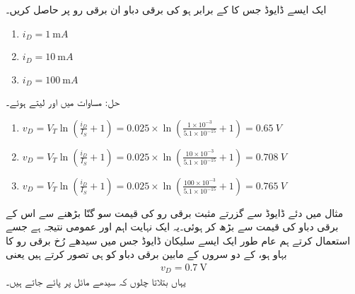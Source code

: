 ایک ایسے  ڈایوڈ جس کا   کے برابر ہو کی برقی دباو   ان برقی رو  پر حاصل کریں۔
\begin{enumerate}
\item
$i_D=\SI{1}{\milli A}$
\item
$i_D=\SI{10}{\milli A}$
\item
$i_D=\SI{100}{\milli A}$
\end{enumerate}
حل: مساوات   میں   اور  لیتے ہوئے۔
\begin{enumerate}
\item
$v_D=V_T \ln \left (\frac{i_D}{I_S}+1 \right ) =0.025 \times \ln \left (\frac{1 \times 10^{-3}}{5.1 \times 10^{-15}}+1 \right ) =\SI{0.65}{V}$
\item
$v_D=V_T \ln \left (\frac{i_D}{I_S}+1 \right ) =0.025 \times \ln \left (\frac{10 \times 10^{-3}}{5.1 \times 10^{-15}}+1 \right ) =\SI{0.708}{V}$
\item
$v_D=V_T \ln \left (\frac{i_D}{I_S}+1 \right ) =0.025 \times \ln \left (\frac{100 \times 10^{-3}}{5.1 \times 10^{-15}}+1 \right ) =\SI{0.765}{V}$
\end{enumerate}

مثال میں دئے ڈایوڈ سے گزرتے مثبت برقی رو  کی قیمت  سو گنّا بڑھنے سے اس کے برقی دباو   کی قیمت  سے بڑھ کر  ہوئی۔یہ ایک نہایت اہم اور عمومی نتیجہ ہے جسے استعمال کرتے ہم عام طور ایک ایسے سلیکان ڈایوڈ   جس میں سیدھے رُخ برقی رو کا بہاو ہو، کے دو سروں کے مابین برقی دباو کو   ہی تصور کرتے ہیں یعنی
\begin{align}
v_D=\SI{0.7}{\volt}
\end{align}
یہاں بتلاتا چلوں کہ سیدھے مائل  پر  پائے جاتے ہیں۔  

